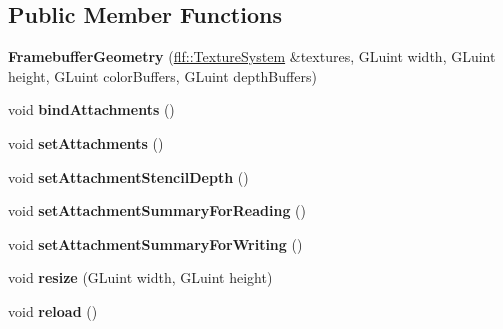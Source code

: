 \subsection*{Public Member Functions}
\begin{DoxyCompactItemize}
\item 
{\bfseries Framebuffer\+Geometry} (\hyperlink{classflw_1_1flf_1_1TextureSystem}{flf\+::\+Texture\+System} \&textures, G\+Luint width, G\+Luint height, G\+Luint color\+Buffers, G\+Luint depth\+Buffers)\hypertarget{classflw_1_1flc_1_1FramebufferGeometry_a73ef82a08dabc4ab9f22532739280a3a}{}\label{classflw_1_1flc_1_1FramebufferGeometry_a73ef82a08dabc4ab9f22532739280a3a}

\item 
void {\bfseries bind\+Attachments} ()\hypertarget{classflw_1_1flc_1_1FramebufferGeometry_af50fc97cbd0dcaa71b0d1e394df904ff}{}\label{classflw_1_1flc_1_1FramebufferGeometry_af50fc97cbd0dcaa71b0d1e394df904ff}

\item 
void {\bfseries set\+Attachments} ()\hypertarget{classflw_1_1flc_1_1FramebufferGeometry_a2a6d3c1726f0ad74753754ff4ea93ee4}{}\label{classflw_1_1flc_1_1FramebufferGeometry_a2a6d3c1726f0ad74753754ff4ea93ee4}

\item 
void {\bfseries set\+Attachment\+Stencil\+Depth} ()\hypertarget{classflw_1_1flc_1_1FramebufferGeometry_a4bf62a57889b708f77eca52019d2d329}{}\label{classflw_1_1flc_1_1FramebufferGeometry_a4bf62a57889b708f77eca52019d2d329}

\item 
void {\bfseries set\+Attachment\+Summary\+For\+Reading} ()\hypertarget{classflw_1_1flc_1_1FramebufferGeometry_a6eb7626820ef3a809e2b991623a94371}{}\label{classflw_1_1flc_1_1FramebufferGeometry_a6eb7626820ef3a809e2b991623a94371}

\item 
void {\bfseries set\+Attachment\+Summary\+For\+Writing} ()\hypertarget{classflw_1_1flc_1_1FramebufferGeometry_a87cd7514a43b439abf9600898e586cfe}{}\label{classflw_1_1flc_1_1FramebufferGeometry_a87cd7514a43b439abf9600898e586cfe}

\item 
void {\bfseries resize} (G\+Luint width, G\+Luint height)\hypertarget{classflw_1_1flc_1_1FramebufferGeometry_a63dd366139773a4fd028a9b8fb98f150}{}\label{classflw_1_1flc_1_1FramebufferGeometry_a63dd366139773a4fd028a9b8fb98f150}

\item 
void {\bfseries reload} ()\hypertarget{classflw_1_1flc_1_1FramebufferGeometry_a7e1c50e4964c2d595ad344086239189d}{}\label{classflw_1_1flc_1_1FramebufferGeometry_a7e1c50e4964c2d595ad344086239189d}

\end{DoxyCompactItemize}

